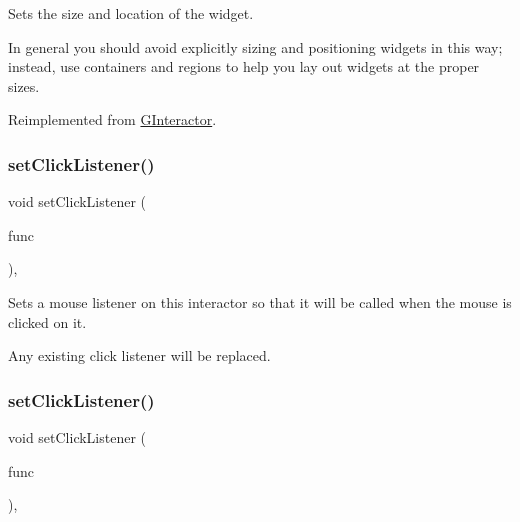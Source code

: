 Sets the size and location of the widget. 

In general you should avoid explicitly sizing and positioning widgets in this way; instead, use containers and regions to help you lay out widgets at the proper sizes. 

Reimplemented from \mbox{\hyperlink{classsgl_1_1GInteractor_acada386653f008cacc7cce86426bef7c}{G\+Interactor}}.

\mbox{\label{classsgl_1_1GInteractor_abd40af6921242584d0954f173911b190}} 
\subsubsection{\texorpdfstring{set\+Click\+Listener()}{setClickListener()}\hspace{0.1cm}{\footnotesize\ttfamily [1/2]}}
{\footnotesize\ttfamily void set\+Click\+Listener (\begin{DoxyParamCaption}\item[{\mbox{\hyperlink{namespacesgl_ae9f3e9eab70035da1a2b114e21357b25}{G\+Event\+Listener}}}]{func }\end{DoxyParamCaption})\hspace{0.3cm}{\ttfamily [virtual]}, {\ttfamily [inherited]}}



Sets a mouse listener on this interactor so that it will be called when the mouse is clicked on it. 

Any existing click listener will be replaced. \mbox{\label{classsgl_1_1GInteractor_a856414c92df90f56f3877475eb3f8fc4}} 
\subsubsection{\texorpdfstring{set\+Click\+Listener()}{setClickListener()}\hspace{0.1cm}{\footnotesize\ttfamily [2/2]}}
{\footnotesize\ttfamily void set\+Click\+Listener (\begin{DoxyParamCaption}\item[{\mbox{\hyperlink{namespacesgl_a54427ce97bb1c2804e4fe2b0a62e8b17}{G\+Event\+Listener\+Void}}}]{func }\end{DoxyParamCaption})\hspace{0.3cm}{\ttfamily [virtual]}, {\ttfamily [inherited]}}



